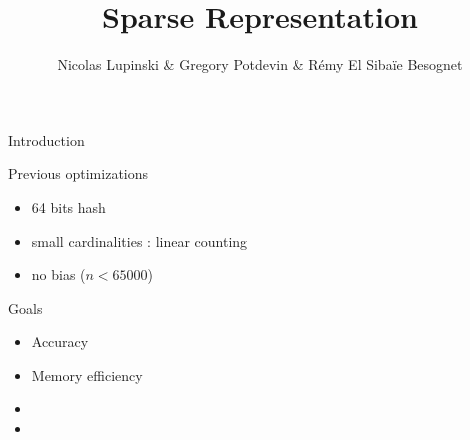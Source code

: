 \documentclass{beamer}
\title{Sparse Representation}
\author{Nicolas Lupinski \& Gregory Potdevin \& Rémy El Sibaïe Besognet}
\begin{document}
\begin{frame}
  \titlepage  
\end{frame}


\begin{frame}{Introduction}

\begin{block}{Previous optimizations}
\begin{itemize}
\item 64 bits hash
\item small cardinalities : linear counting
\item no bias ($n < 65000$)
\end{itemize}
\end{block}


\begin{block}{Goals}
\begin{itemize}
\item Accuracy
\item Memory efficiency
\item {} 
\item {} 
\end{itemize}
\end{block}


\end{frame}

\end{document}
